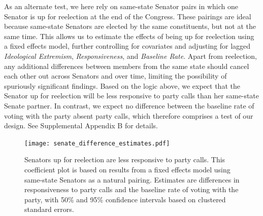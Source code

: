 \documentclass[12pt]{article}
\begin{document}
As an alternate test, we here rely on same-state Senator pairs in which one Senator is up for reelection at the end of the Congress.  These pairings are ideal because same-state Senators are elected by the same constituents, but not at the same time.  This allows us to estimate the effects of being up for reelection using a fixed effects model, further controlling for covariates and adjusting for lagged \textit{Ideological Extremism}, \textit{Responsiveness}, and \textit{Baseline Rate}.  Apart from reelection, any additional differences between members from the same state should cancel each other out across Senators and over time, limiting the possibility of spuriously significant findings.  Based on the logic above, we expect that the Senator up for reelection will be less responsive to party calls than her same-state Senate partner.  In contrast, we expect no difference between the baseline rate of voting with the party absent party calls, which therefore comprises a test of our design. See Supplemental Appendix B for details.

\begin{figure}[!htbp]
\centering
\texttt{[image: senate\_difference\_estimates.pdf]}

\caption{Senators up for reelection are less responsive to party calls.
This coefficient plot is based on results from a fixed effects model using same-state Senators as a natural pairing. Estimates are differences in responsiveness to party calls and the baseline rate of voting with the party, with 50\% and 95\% confidence intervals based on clustered standard errors.
\label{fig-reelection-responsiveness}}
\end{figure}
\end{document}
